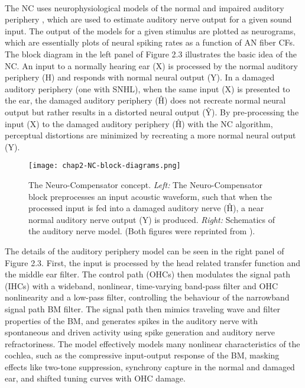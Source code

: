 \paragraph{}The NC uses neurophysiological models of the normal and impaired auditory periphery \cite{Bruce2003}, which are used to  estimate auditory nerve output for a given sound input.  The output of the models for a given stimulus are plotted as neurograms, which are essentially plots of neural spiking rates as a function of AN fiber CFs.  The block diagram in the left panel of Figure 2.3 illustrates the basic idea of the NC.  An input to a normally hearing ear (X) is processed by the normal auditory periphery (H) and responds with normal neural output (Y).  In a damaged auditory periphery (one with SNHL), when the same input (X) is presented to the ear, the damaged auditory periphery (\^{H}) does not recreate normal neural output but rather results in a distorted neural output (\^{Y}).  By pre-processing the input (X) to the damaged auditory periphery (\^{H}) with the NC algorithm, perceptual distortions are minimized by recreating a more normal neural output (Y).

\begin{figure}[ht]
\begin{center}
\texttt{[image: chap2-NC-block-diagrams.png]} \\
\caption[Neuro-Compensator concept]{The Neuro-Compensator concept.  \emph{Left:} The Neuro-Compensator block preprocesses an input acoustic waveform, such that when the processed input is fed into a damaged auditory nerve (\^{H}), a near normal auditory nerve output (Y) is produced.  \emph{Right:} Schematics of the  auditory nerve model.  (Both figures were reprinted from ). }
\label{ch2-NC-block-diagrams}
\end{center}
\end{figure}
	
The details of the auditory periphery model can be seen in the right panel of Figure 2.3.  First, the input is processed by the  head related transfer function and the middle ear filter.  The control path (OHCs) then modulates the signal path (IHCs) with a wideband, nonlinear, time-varying band-pass filter and OHC nonlinearity and a low-pass filter, controlling the behaviour of the narrowband signal path BM filter.  The signal path then mimics traveling wave and filter properties of the BM, and generates spikes in the auditory nerve with spontaneous and driven activity using spike generation and auditory nerve refractoriness.  The  model effectively models many nonlinear characteristics of the cochlea, such as the compressive input-output response of the BM, masking effects like two-tone suppression, synchrony capture in the normal and damaged ear, and shifted tuning curves with OHC damage.

